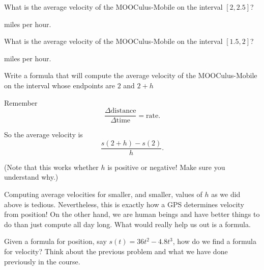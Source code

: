 \documentclass{ximera}
\begin{document}


\begin{problem}
  What is the average velocity of the MOOCulus-Mobile on the interval $[2,2.5]$?
  \begin{prompt} %
     miles per hour.
  \end{prompt}
\end{problem}


\begin{problem}
  What is the average velocity of the MOOCulus-Mobile on the interval $[1.5,2]$?
  \begin{prompt} %
     miles per hour.
  \end{prompt}
\end{problem}

\begin{problem}
  Write a formula that will compute the average velocity of the
  MOOCulus-Mobile on the interval whose endpoints are $2$ and $2+h$
\begin{hint}
Remember
\[
\frac{\Delta\text{distance}}{\Delta\text{time}} = \text{rate}.
\]
\end{hint}
\begin{hint}
So the average velocity is
\[
\frac{s(2+h)-s(2)}{h}.
\]

(Note that this works whether $h$ is positive or negative!  Make sure you understand why.)
\end{hint}
\end{problem}

Computing average velocities for smaller, and smaller, values of $h$ as
we did above is tedious. Nevertheless, this is exactly how a GPS
determines velocity from position! On the other hand, we are human
beings and have better things to do than just compute all day
long. What would really help us out is a formula.

\begin{problem}
  Given a formula for position, say $s(t) = 36t^2 -4.8t^3$, how do we
  find a formula for velocity?  Think about the previous problem and
  what we have done previously in the course.
  \begin{freeResponse}
  \end{freeResponse} 
\end{problem}
\end{document}
